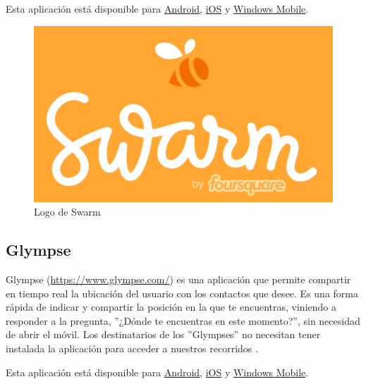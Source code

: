 Esta aplicación está disponible para \href{https://play.google.com/store/apps/details?id=com.foursquare.robin}{Android}, \href{https://itunes.apple.com/US/app/id870161082?mt=8}{iOS} y \href{https://www.microsoft.com/es-es/store/apps/swarm/9wzdncrdrsq1}{Windows Mobile}.

\begin{figure}[h!btp]
\centering
\includegraphics[scale=0.25, fbox={\fboxrule} 4mm]{images/03-antecedentes/39-swarm.png}
\caption{Logo de Swarm}
\label{fig:swarm}
\end{figure}

\subsection{Glympse}
Glympse (\url{https://www.glympse.com/}) es una aplicación que permite compartir en tiempo real la ubicación del usuario con los contactos que desee. Es una forma rápida de indicar y compartir la posición en la que te encuentras, viniendo a responder a la pregunta, ''¿Dónde te encuentras en este momento?'', sin necesidad de abrir el móvil. Los destinatarios de los ''Glympses'' no necesitan tener instalada la aplicación para acceder a nuestros recorridos \cite{Unk15}.

Esta aplicación está disponible para \href{https://play.google.com/store/apps/details?id=com.glympse.android.glympse}{Android}, \href{https://itunes.apple.com/app/glympse-share-gps-location/id330316698?mt=8}{iOS} y \href{https://www.microsoft.com/es-es/store/apps/glympse/9wzdncrdf9sj}{Windows Mobile}.

